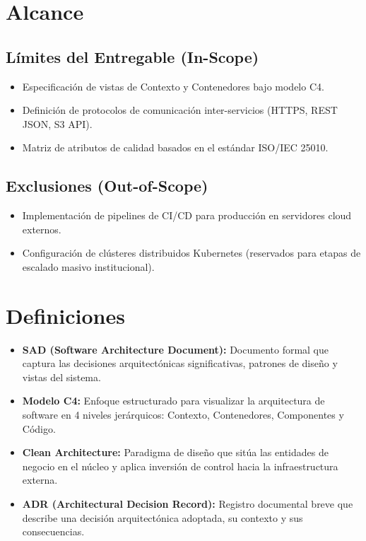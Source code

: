 \documentclass[12pt,a4paper]{article}
\begin{document}
\section{Alcance}
\subsection{Límites del Entregable (In-Scope)}
\begin{itemize}[leftmargin=1.5em, itemsep=2pt]
    \item Especificación de vistas de Contexto y Contenedores bajo modelo C4.
    \item Definición de protocolos de comunicación inter-servicios (HTTPS, REST JSON, S3 API).
    \item Matriz de atributos de calidad basados en el estándar ISO/IEC 25010.
\end{itemize}
\subsection{Exclusiones (Out-of-Scope)}
\begin{itemize}[leftmargin=1.5em, itemsep=2pt]
    \item Implementación de pipelines de CI/CD para producción en servidores cloud externos.
    \item Configuración de clústeres distribuidos Kubernetes (reservados para etapas de escalado masivo institucional).
\end{itemize}

\section{Definiciones}
\begin{itemize}[leftmargin=1.5em, itemsep=2pt]
    \item \textbf{SAD (Software Architecture Document):} Documento formal que captura las decisiones arquitectónicas significativas, patrones de diseño y vistas del sistema.
    \item \textbf{Modelo C4:} Enfoque estructurado para visualizar la arquitectura de software en 4 niveles jerárquicos: Contexto, Contenedores, Componentes y Código.
    \item \textbf{Clean Architecture:} Paradigma de diseño que sitúa las entidades de negocio en el núcleo y aplica inversión de control hacia la infraestructura externa.
    \item \textbf{ADR (Architectural Decision Record):} Registro documental breve que describe una decisión arquitectónica adoptada, su contexto y sus consecuencias.
\end{itemize}
\end{document}
